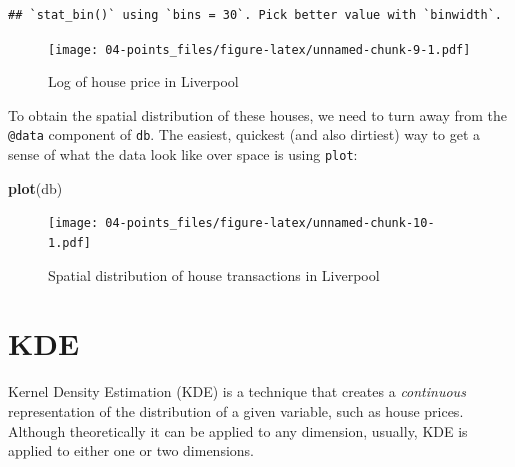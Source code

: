 \documentclass[
]{book}
\newenvironment{Shaded}{\begin{snugshade}}{\end{snugshade}}
\newcommand{\CommentTok}[1]{\textcolor[rgb]{0.56,0.35,0.01}{\textit{#1}}}
\newcommand{\DataTypeTok}[1]{\textcolor[rgb]{0.13,0.29,0.53}{#1}}
\newcommand{\KeywordTok}[1]{\textcolor[rgb]{0.13,0.29,0.53}{\textbf{#1}}}
\newcommand{\NormalTok}[1]{#1}
\newcommand{\OperatorTok}[1]{\textcolor[rgb]{0.81,0.36,0.00}{\textbf{#1}}}
\newcommand{\StringTok}[1]{\textcolor[rgb]{0.31,0.60,0.02}{#1}}
\begin{document}
\begin{Shaded}
\end{Shaded}

\begin{verbatim}
## `stat_bin()` using `bins = 30`. Pick better value with `binwidth`.
\end{verbatim}

\begin{figure}
\centering
\texttt{[image: 04-points\_files/figure-latex/unnamed-chunk-9-1.pdf]}
\caption{\label{fig:unnamed-chunk-9}Log of house price in Liverpool}
\end{figure}

To obtain the spatial distribution of these houses, we need to turn away from the \texttt{@data} component of \texttt{db}. The easiest, quickest (and also dirtiest) way to get a sense of what the data look like over space is using \texttt{plot}:

\begin{Shaded}
\begin{Highlighting}[]
\KeywordTok{plot}\NormalTok{(db)}
\end{Highlighting}
\end{Shaded}

\begin{figure}
\centering
\texttt{[image: 04-points\_files/figure-latex/unnamed-chunk-10-1.pdf]}
\caption{\label{fig:unnamed-chunk-10}Spatial distribution of house transactions in Liverpool}
\end{figure}

\hypertarget{kde}{%
\section{KDE}\label{kde}}

Kernel Density Estimation (KDE) is a technique that creates a \emph{continuous} representation of the distribution of a given variable, such as house prices. Although theoretically it can be applied to any dimension, usually, KDE is applied to either one or two dimensions.
\end{document}
